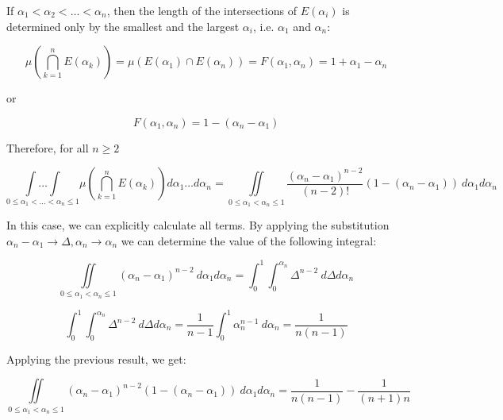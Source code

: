 \documentclass{article}
\theoremstyle{definition}
\begin{document}
\begin{appendices}
If $\alpha_1 < \alpha_2 < \dots < \alpha_n$, then the length of the intersections of $E(\alpha_i)$ is determined only by the smallest and the largest $\alpha_i$, i.e. $\alpha_1$ and $\alpha_n$:

\begin{equation}
    \mu \left ( 
    \bigcap_{k=1}^n E(\alpha_k)
    \right ) 
    =
    \mu \left (
    E(\alpha_1) \cap E(\alpha_n)
    \right )
    =
    F(\alpha_1,\alpha_n)
    =1+\alpha_1-\alpha_n
\end{equation}

or 

\begin{equation}
    F(\alpha_1,\alpha_n)
    =1-(\alpha_n-\alpha_1)
\end{equation}


Therefore, for all $n\ge 2$

\begin{equation}
    \underset{0 \le \alpha_1 < \dots < \alpha_n \le 1}{\int\dots\int}
    \mu \left ( 
    \bigcap_{k=1}^n E(\alpha_k)
    \right ) 
    d\alpha_1\dots d\alpha_n
    =
    \iint\limits_{0 \le \alpha_1 < \alpha_n \le 1}
    \frac{(\alpha_n-\alpha_1)^{n-2}}{(n-2)!}
    (1-(\alpha_n-\alpha_1)) \ d\alpha_1 d\alpha_n
\end{equation}

In this case, we can explicitly calculate all terms. By applying the substitution $\alpha_n-\alpha_1 \to \Delta, \alpha_n \to \alpha_n$ we can determine the value of the following integral:

\begin{equation}
    \iint\limits_{0 \le \alpha_1 < \alpha_n \le 1}
    (\alpha_n-\alpha_1)^{n-2}
    \ d\alpha_1 d\alpha_n
    =
    \int_0^1 \int_0^{\alpha_n} \Delta^{n-2} \ d \Delta d \alpha_n
\end{equation}

\begin{equation}
    \int_0^1 \int_0^{\alpha_n} \Delta^{n-2} \ d \Delta d \alpha_n
    =
    \frac{1}{n-1} \int_0^1  \alpha_n^{n-1} \ d \alpha_n
    =
    \frac{1}{n(n-1)}
\end{equation}

Applying the previous result, we get:

\begin{equation}
    \iint\limits_{0 \le \alpha_1 < \alpha_n \le 1}
    (\alpha_n-\alpha_1)^{n-2}
    (1-(\alpha_n-\alpha_1)) \ d\alpha_1 d\alpha_n
    =
    \frac{1}{n(n-1)} - \frac{1}{(n+1)n}
\end{equation}


\end{appendices}
\end{document}
